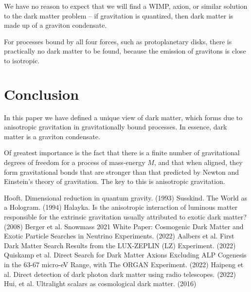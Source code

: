 \documentclass[12pt]{article}
\begin{document}
We have no reason to expect that we will find a WIMP, axion, or similar solution \cite{berger, aalbers, quiskamp, haipeng, hui} to the dark matter problem -- if gravitation is quantized, then dark matter is made up of a graviton condensate.

For processes bound by all four forces, such as protoplanetary disks, there is practically no dark matter to be found, because the emission of gravitons is close to isotropic.




\section{Conclusion}

In this paper we have defined a unique view of dark matter, which forms due to anisotropic gravitation in gravitationally bound processes.
In essence, dark matter is a graviton condensate.

Of greatest importance is the fact that there is a finite number of gravitational degrees of freedom for a process of mass-energy $M$, and that when aligned, they form gravitational bonds that are stronger than that predicted by Newton and Einstein's theory of gravitation.
The key to this is anisotropic gravitation.






\begin{thebibliography}{9}
 Hooft. Dimensional reduction in quantum gravity. (1993)
 Susskind. The World as a Hologram. (1994)
 Halayka. Is the anisotropic interaction of luminous matter responsible for the extrinsic gravitation usually attributed to exotic dark matter? (2008)
 Berger et al. Snowmass 2021 White Paper: Cosmogenic Dark Matter and Exotic Particle Searches in Neutrino Experiments. (2022)
 Aalbers et al. First Dark Matter Search Results from the LUX-ZEPLIN (LZ) Experiment. (2022)
 Quiskamp et al. Direct Search for Dark Matter Axions Excluding ALP Cogenesis in the 63-67 micro-eV Range, with The ORGAN Experiment. (2022)
 Haipeng et al. Direct detection of dark photon dark matter using radio telescopes. (2022)
 Hui, et al. Ultralight scalars as cosmological dark matter. (2016)
\end{thebibliography}
\end{document}
